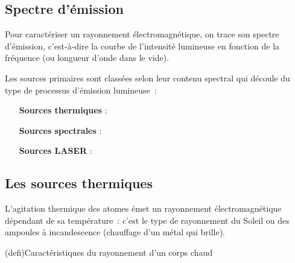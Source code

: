 \documentclass[../../main/main.tex]{subfiles}
\begin{document}
\subsection{Spectre d'émission}

Pour caractériser un rayonnement électromagnétique, on trace son spectre
d'émission, c'est-à-dire la courbe de l'intensité lumineuse en fonction de la
fréquence (ou longueur d'onde dans le vide).

Les sources primaires sont classées selon leur contenu spectral
qui découle du type de processus d'émission lumineuse~:
\begin{itemize}[leftmargin=120pt]
	\item[\textbf{Sources thermiques}] : 
	\item[\textbf{Sources spectrales}] : 
	\item[\textbf{Sources LASER}] : 
\end{itemize}

\subsection{Les sources thermiques}

L'agitation thermique des atomes émet un rayonnement électromagnétique dépendant
de sa température~: c'est le type de rayonnement du Soleil ou des ampoules à
incandescence (chauffage d'un métal qui brille).

\begin{tcb}(defi){Caractéristiques du rayonnement d'un corps chaud}

\end{tcb}
\end{document}
